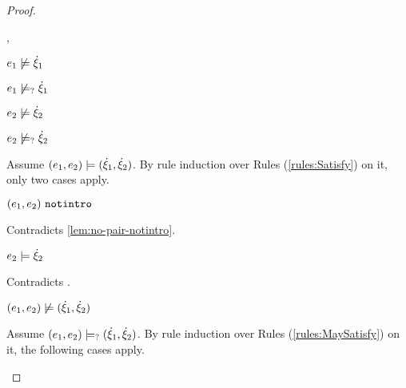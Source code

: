 \begin{proof}
\begin{byCases}
\begin{byCases}
\begin{byCases}
        \item[\cnotsatisfyormay{e_1}{\hxi_1},\cnotsatisfyormay{e_2}{\hxi_2}]
            \begin{pfsteps*}
            \item $e_1 \not\models \dot{\xi}_1$  
            \item $e_1 \not\models_{?} \dot{\xi}_1$  
            \item $e_2 \not\models \dot{\xi}_2$  
            \item $e_2 \not\models_{?} \dot{\xi}_2$  
            \end{pfsteps*}
            Assume $(e_1 , e_2) \models (\dot{\xi}_1 , \dot{\xi}_2)$. By rule induction over Rules (\ref{rules:Satisfy}) on it, only two cases apply. 
           \begin{byCases}
            \item[\text{(\ref{rule:CSNotIntroPair})}]
                \begin{pfsteps*}
                \item $(e_1 , e_2) ~\mathtt{notintro}$ 
                \end{pfsteps*}
                Contradicts \autoref{lem:no-pair-notintro}.
            \item[\text{(\ref{rule:CSPair})}]
                \begin{pfsteps*}
                \item $e_2 \models \dot{\xi}_2$ 
                \end{pfsteps*}
                Contradicts .
            \end{byCases}
            \begin{pfsteps*}
            \item $(e_1 , e_2) \not\models (\dot{\xi}_1 , \dot{\xi}_2)$  
            \end{pfsteps*}
            Assume $(e_1 , e_2) \models_{?} (\dot{\xi}_1 , \dot{\xi}_2)$. By rule induction over Rules (\ref{rules:MaySatisfy}) on it, the following cases apply.
            \begin{byCases}
            \item[\text{(\ref{rule:CMSNotIntro})}]

\end{byCases}
\end{byCases}
\end{byCases}
\end{byCases}
\end{proof}
